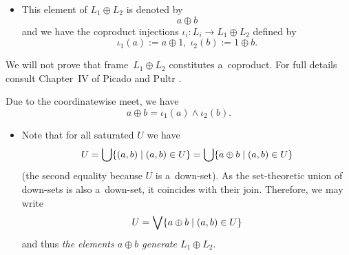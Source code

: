 \begin{itemize}
\item This element of $L_1 \oplus L_2$ is denoted by
\[
  a \oplus b
\]
and we have the coproduct injections $\iota_i: L_i \to L_1 \oplus
L_2$ defined by
\[
  \iota_1(a) := a \oplus 1, \; \iota_2(b) := 1 \oplus b.
\]
\end{itemize}

We will not prove that frame~$L_1 \oplus L_2$ constitutes a~coproduct.
For full details consult Chapter~IV of Picado and Pultr
\cite{picado-pultr12}.

\begin{cor}
 \label{oplus-iota}
Due to the coordinatewise meet, we have
\[
  a \oplus b = \iota_1(a) \wedge \iota_2(b).
\]
\end{cor}

\begin{itemize}
\item
Note that for all saturated $U$ we have
\[
  U
  = \bigcup \{ (a, b) \mid (a, b)\in U \} = \bigcup \{ a \oplus b \mid (a, b)\in
  U \}
\]
(the second equality because $U$ is a~down-set).
As the set-theoretic union of down-sets is also a~down-set, it coincides with
their join.
Therefore, we may write
\[
  U
  = \bigvee \{ a \oplus b \mid (a, b)\in U \}
\]
and thus
 \label{a+b-gen}
\emph{the elements $a \oplus b$ generate $L_1 \oplus L_2$\/}.
\end{itemize}

